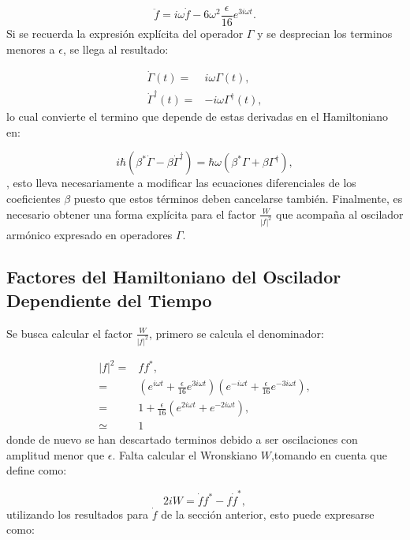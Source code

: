 \documentclass[a4paper,10pt]{report}
\begin{document}
\begin{equation}
\ddot{f} = i\omega\dot{f} - 6\omega^2\frac{\epsilon}{16} e^{3i\omega t}.
\end{equation}Si se recuerda la expresión explícita del operador $\Gamma$ y se desprecian los terminos menores a $\epsilon$, se llega al resultado:

\begin{align}
\dot{\Gamma}(t) =& i\omega \Gamma(t),\\
\dot{\Gamma}^\dagger(t) =& -i\omega \Gamma^\dagger(t),
\end{align} lo cual convierte el termino que depende de estas derivadas en el Hamiltoniano en:

\begin{equation}
i\hbar(\beta^*\dot{\Gamma}-\beta\dot{\Gamma}^\dagger) = \hbar\omega(\beta^*\Gamma+\beta\Gamma^{\dagger}),
\end{equation}, esto lleva necesariamente a modificar las ecuaciones diferenciales de los coeficientes $\beta$ puesto que estos términos deben cancelarse también. Finalmente, es necesario obtener una forma explícita para el factor $\frac{W}{|f|^2}$ que acompaña al oscilador armónico expresado en operadores $\Gamma$.

\subsection{Factores del Hamiltoniano del Oscilador Dependiente del Tiempo}

Se busca calcular el factor $\frac{W}{|f|^2}$, primero se calcula el denominador:

\begin{align*}
|f|^2=&ff^*,\\
=& (e^{i\omega t} + \frac{\epsilon}{16} e^{3i\omega t})(e^{-i\omega t} + \frac{\epsilon}{16} e^{-3i\omega t}),\\
=& 1+\frac{\epsilon}{16}(e^{2i\omega t}+e^{-2i\omega t}),\\
\simeq & 1
\end{align*} donde de nuevo se han descartado terminos debido a ser oscilaciones con amplitud menor que $\epsilon$. Falta calcular el Wronskiano $W$,tomando en cuenta que \cite{BrownPT} define como:

\begin{equation}
2iW = \dot{f}f^* - f\dot{f}^*,
\end{equation} utilizando los resultados para $\dot{f}$ de la sección anterior, esto puede expresarse como:
\end{document}
